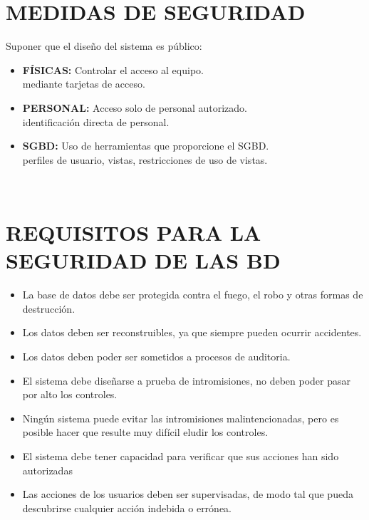 \documentclass[conference]{IEEEtran}
\begin{document}
\section{MEDIDAS DE SEGURIDAD}

Suponer que el diseño del sistema es público:
\begin{itemize}
\item \textbf{FÍSICAS:} Controlar el acceso al equipo.
\\
mediante tarjetas de acceso.
\item \textbf{PERSONAL:} Acceso solo de personal autorizado.
\\
identificación directa de personal.
\item \textbf{SGBD:} Uso de herramientas que proporcione el SGBD.
\\
perfiles de usuario, vistas, restricciones de uso de vistas.
\\
\end{itemize}
\\

\section{REQUISITOS PARA LA SEGURIDAD DE LAS BD}
\begin{itemize}
\item \textbf{} La base de datos debe ser protegida contra el fuego, el robo y otras formas de destrucción.
\\
\item \textbf{} Los datos deben ser reconstruibles, ya que siempre pueden ocurrir accidentes.
\\
\item \textbf{} Los datos deben poder ser sometidos a procesos de auditoria.
\\
\item \textbf{} El sistema debe diseñarse a prueba de intromisiones, no deben poder pasar por alto los controles.
\\
\item \textbf{} Ningún sistema puede evitar las intromisiones malintencionadas, pero es posible hacer que resulte muy difícil eludir los controles.
\\
\item \textbf{} El sistema debe tener capacidad para verificar que sus acciones han sido autorizadas
\\
\item \textbf{} Las acciones de los usuarios deben ser supervisadas, de modo tal que pueda descubrirse cualquier acción indebida o errónea.
\\
\end{itemize}
\end{document}
